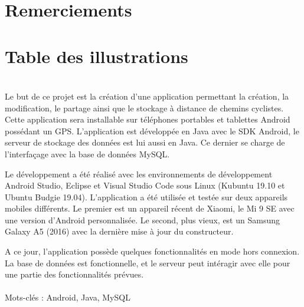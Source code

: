 \documentclass[a4paper, 12pt]{report}
\begin{document}
\section*{Remerciements}

\newpage
\section*{Table des illustrations}
\newpage
\section*{}
	\indent
	Le but de ce projet est la création d'une application permettant la création, la modification, le partage ainsi que le stockage à distance de chemins cyclistes. 
	Cette application sera installable sur téléphones portables et tablettes Android possédant un GPS. L'application est développée en Java avec le SDK Android, le serveur de stockage des données est lui aussi en Java.
	Ce dernier se charge de l'interfaçage avec la base de données MySQL.
	\\\par
	Le développement a été réalisé avec les environnements de développement Android Studio, Eclipse et Visual Studio Code sous Linux (Kubuntu 19.10 et Ubuntu Budgie 19.04). L'application a été utilisée et testée sur deux appareils mobiles différents.
	Le premier est un appareil récent de Xiaomi, le Mi 9 SE avec une version d'Android personnalisée.
	Le second, plus vieux, est un Samsung Galaxy A5 (2016) avec la dernière mise à jour du constructeur.
	\\\par
	A ce jour, l'application possède quelques fonctionnalités en mode hors connexion.
	La base de données est fonctionnelle, et le serveur peut intéragir avec elle pour une partie des fonctionnalités prévues.
	\\\\
	Mots-clés : Android, Java, MySQL
\end{document}
